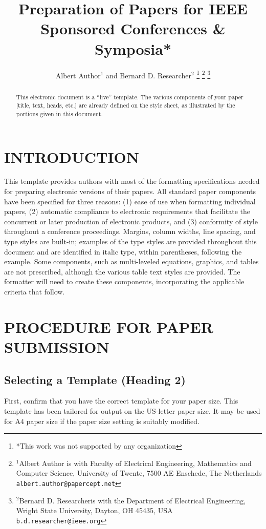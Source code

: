 \documentclass[letterpaper, 10 pt, conference]{ieeeconf}  %
\title{\LARGE \bf
Preparation of Papers for IEEE Sponsored Conferences \& Symposia*
}
\author{Albert Author$^{1}$ and Bernard D. Researcher$^{2}$%
\thanks{*This work was not supported by any organization}%
\thanks{$^{1}$Albert Author is with Faculty of Electrical Engineering, Mathematics and Computer Science,
        University of Twente, 7500 AE Enschede, The Netherlands
        {\tt\small albert.author@papercept.net}}%
\thanks{$^{2}$Bernard D. Researcheris with the Department of Electrical Engineering, Wright State University,
        Dayton, OH 45435, USA
        {\tt\small b.d.researcher@ieee.org}}%
}
\begin{document}
\maketitle
\thispagestyle{empty}
\pagestyle{empty}


\begin{abstract}

This electronic document is a “live” template. The various components of your paper [title, text, heads, etc.] are already defined on the style sheet, as illustrated by the portions given in this document.

\end{abstract}


\section{INTRODUCTION}

This template provides authors with most of the formatting specifications needed for preparing electronic versions of their papers. All standard paper components have been specified for three reasons: (1) ease of use when formatting individual papers, (2) automatic compliance to electronic requirements that facilitate the concurrent or later production of electronic products, and (3) conformity of style throughout a conference proceedings. Margins, column widths, line spacing, and type styles are built-in; examples of the type styles are provided throughout this document and are identified in italic type, within parentheses, following the example. Some components, such as multi-leveled equations, graphics, and tables are not prescribed, although the various table text styles are provided. The formatter will need to create these components, incorporating the applicable criteria that follow.

\section{PROCEDURE FOR PAPER SUBMISSION}

\subsection{Selecting a Template (Heading 2)}

First, confirm that you have the correct template for your paper size. This template has been tailored for output on the US-letter paper size. 
It may be used for A4 paper size if the paper size setting is suitably modified.
\end{document}
